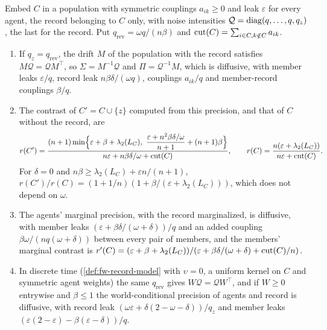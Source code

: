 \begin{proposition}\label{prop:hie-record-contrast}
Embed $C$ in a population with symmetric couplings $a_{ik}\ge0$ and leak $\varepsilon$ for every agent, the record belonging to $C$ only, with noise intensities $\mathcal Q=\operatorname{diag}(q,\dots,q,q_z)$, the last for the record. Put $q_{\mathrm{rev}}=\omega q/(n\beta)$ and $\operatorname{cut}(C)=\sum_{i\in C,k\notin C}a_{ik}$.
\begin{enumerate}
\item[(a)] If $q_z=q_{\mathrm{rev}}$, the drift $M$ of the population with the record satisfies $M\mathcal Q=\mathcal QM^\top$, so $\Sigma=M^{-1}\mathcal Q$ and $\Pi=\mathcal Q^{-1}M$, which is diffusive, with member leaks $\varepsilon/q$, record leak $n\beta\delta/(\omega q)$, couplings $a_{ik}/q$ and member-record couplings $\beta/q$.
\item[(b)] The contrast of $C'=C\cup\{z\}$ computed from this precision, and that of $C$ without the record, are
\begin{equation}\label{eq:hie-record-contrast}
r(C')=\frac{(n+1)\min\Bigl\{\varepsilon+\beta+\lambda_2(L_C),\ \dfrac{\varepsilon+n^2\beta\delta/\omega}{n+1}+(n+1)\beta\Bigr\}}{n\varepsilon+n\beta\delta/\omega+\cut(C)},\qquad r(C)=\frac{n(\varepsilon+\lambda_2(L_C))}{n\varepsilon+\cut(C)}.
\end{equation}
For $\delta=0$ and $n\beta\ge\lambda_2(L_C)+\varepsilon n/(n+1)$, $r(C')/r(C)=(1+1/n)(1+\beta/(\varepsilon+\lambda_2(L_C)))$, which does not depend on $\omega$.
\item[(c)] The agents' marginal precision, with the record marginalized, is diffusive, with member leaks $(\varepsilon+\beta\delta/(\omega+\delta))/q$ and an added coupling $\beta\omega/(nq(\omega+\delta))$ between every pair of members, and the members' marginal contrast is $r'(C)=(\varepsilon+\beta+\lambda_2(L_C))/(\varepsilon+\beta\delta/(\omega+\delta)+\operatorname{cut}(C)/n)$.
\item[(d)] In discrete time (\cref{def:fw-record-model} with $\upsilon=0$, a uniform kernel on $C$ and symmetric agent weights) the same $q_{\mathrm{rev}}$ gives $W\mathcal Q=\mathcal QW^\top$, and if $W\ge0$ entrywise and $\beta\le1$ the world-conditional precision of agents and record is diffusive, with record leak $(\omega\varepsilon+\delta(2-\omega-\delta))/q_z$ and member leaks $(\varepsilon(2-\varepsilon)-\beta(\varepsilon-\delta))/q$.
\end{enumerate}
\end{proposition}


